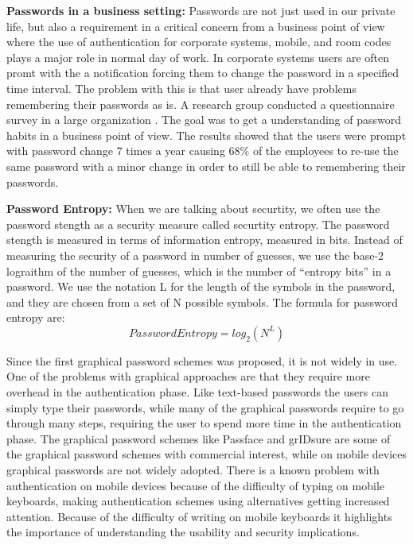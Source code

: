     {\bf Passwords in a business setting:} Passwords are not just used in our private life, but also a requirement in a critical concern from a business point of view where the use of authentication for corporate systems, mobile, and room codes plays a major role in normal day of work. In corporate systems users are often promt with the a notification forcing them to change the password in a specified time interval. The problem with this is that user already have problems remembering their passwords as is. A research group conducted a questionnaire survey in a large organization \cite{habits2}. The goal was to get a understanding of password habits in a business point of view. The results showed that the users were prompt with password change 7 times a year causing 68\% of the employees to re-use the same password with a minor change in order to still be able to remembering their passwords.

    {\bf Password Entropy:} When we are talking about securtity, we often use the password stength as a security measure called securtity entropy. The password stength is measured in terms of information entropy, measured in bits. Instead of measuring the security of a password in number of guesses, we use the base-2 lograithm of the number of guesses, which is the number of ``entropy bits'' in a password. We use the notation L for the length of the symbols in the password, and they are chosen from a set of N possible symbols. The formula for password entropy are:
	  \begin{equation}
	    Password Entropy = log_{2}(N^{L})
	  \end{equation}

    Since the first graphical password schemes was proposed, it is not widely in use. One of the problems with graphical approaches are that they require more overhead in the authentication phase. Like text-based passwords the users can simply type their passwords, while many of the graphical passwords require to go through many steps, requiring the user to spend more time in the authentication phase. The graphical password schemes like Passface and grIDsure are some of the graphical password schemes with commercial interest, while on mobile devices graphical passwords are not widely adopted. There is a known problem with authentication on mobile devices because of the difficulty of typing on mobile keyboards, making authentication schemes using alternatives getting increased attention. Because of the difficulty of writing on mobile keyboards it highlights the importance of understanding the usability and security implications.
